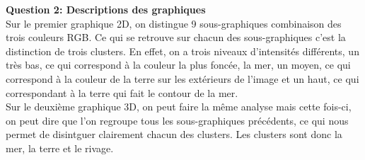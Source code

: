 \clearpage 

\textbf{Question 2: Descriptions des graphiques} \\

Sur le premier graphique 2D, on distingue 9 sous-graphiques combinaison des trois couleurs RGB. Ce qui se retrouve sur
chacun des sous-graphiques c'est la distinction de trois clusters. En effet, on a trois niveaux d'intensités différents,
un très bas, ce qui correspond à la couleur la plus foncée, la mer, un moyen, ce qui correspond à la couleur de la terre
sur les extérieurs de l'image et un haut, ce qui correspondant à la terre qui fait le contour de la mer. \\

Sur le deuxième graphique 3D, on peut faire la même analyse mais cette fois-ci, on peut dire que l'on regroupe tous les
sous-graphiques précédents, ce qui nous permet de disintguer clairement chacun des clusters. Les clusters sont donc la mer, 
la terre et le rivage. 








